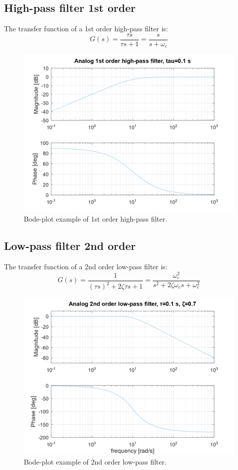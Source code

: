 \documentclass[]{book}
\begin{document}
\hypertarget{high-pass-filter-1st-order}{%
\subsection{High-pass filter 1st order}\label{high-pass-filter-1st-order}}

The transfer function of a 1st order high-pass filter is:
\[
G(s) =  \frac{\tau s}{\tau s + 1} = \frac{s}{s + \omega_c}
\label{eq:hpf1}
\]

\begin{figure}
\includegraphics[width=0.8\linewidth]{images/filters/hpf_1st} \caption{Bode-plot example of 1st order high-pass filter.}\label{fig:unnamed-chunk-2}
\end{figure}

\hypertarget{low-pass-filter-2nd-order}{%
\subsection{Low-pass filter 2nd order}\label{low-pass-filter-2nd-order}}

The transfer function of a 2nd order low-pass filter is:
\[
G(s) =  \frac{1}{(\tau s)^2 + 2\zeta \tau s + 1} = \frac{\omega_c^2}{s^2 + 2\zeta \omega_c s + \omega_c^2}
\label{eq:lpf2}
\]

\begin{figure}
\includegraphics[width=0.8\linewidth]{images/filters/lpf_2nd} \caption{Bode-plot example of 2nd order low-pass filter.}\label{fig:unnamed-chunk-3}
\end{figure}
\end{document}
